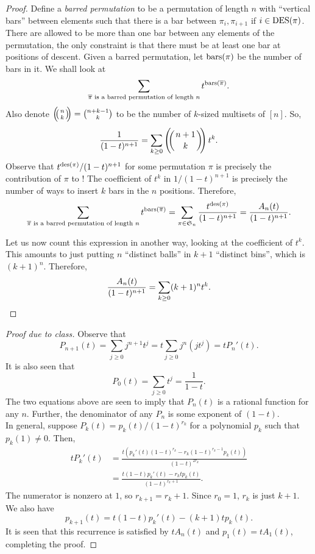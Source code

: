 	\begin{proof}
		Define a \emph{barred permutation} to be a permutation of length $n$ with ``vertical bars'' between elements such that there is a bar between $\pi_i,\pi_{i+1}$ if $i \in \operatorname{DES}(\pi)$. There are allowed to be more than one bar between any elements of the permutation, the only constraint is that there must be at least one bar at positions of descent. Given a barred permutation, let $\operatorname{bars}(\pi)$ be the number of bars in it. We shall look at
		\begin{equation}
			\label{eqn: counting to carlitz identity}
			\sum_{\overline{\pi} \text{ is a barred permutation of length $n$}} t^{\operatorname{bars}(\overline{\pi})}.
		\end{equation}
		Also denote $\mbinom{n}{k} = \binom{n+k-1}{k}$ to be the number of $k$-sized multisets of $[n]$. So,
		\[ \frac{1}{(1-t)^{n+1}} = \sum_{k \ge 0} \mbinom{n+1}{k} t^k. \]
		Observe that $t^{\operatorname{des}(\pi)}/(1-t)^{n+1}$ for some permutation $\pi$ is precisely the contribution of $\pi$ to ! The coefficient of $t^k$ in $1/(1-t)^{n+1}$ is precisely the number of ways to insert $k$ bars in the $n$ positions. Therefore,
		\[ \sum_{\overline{\pi} \text{ is a barred permutation of length $n$}} t^{\operatorname{bars}(\overline{\pi})} = \sum_{\pi \in \mathfrak{S}_n} \frac{t^{\operatorname{des}(\pi)}}{(1-t)^{n+1}} = \frac{A_n(t)}{(1-t)^{n+1}}. \]

		Let us now count this expression in another way, looking at the coefficient of $t^k$. This amounts to just putting $n$ ``distinct balls'' in $k+1$ ``distinct bins'', which is $(k+1)^n$. Therefore,
		\[ \frac{A_n(t)}{(1-t)^{n+1}} = \sum_{k \ge 0} (k+1)^n t^k. \qedhere \] 
	\end{proof}

	\begin{proof}[Proof due to class]
		Observe that
		\[ P_{n+1}(t) = \sum_{j \ge 0} j^{n+1} t^j = t \sum_{j \ge 0} j^n (jt^j) = t P_n'(t). \]
		It is also seen that
		\[ P_0(t) = \sum_{j \ge 0} t^j = \frac{1}{1-t}. \]
		The two equations above are seen to imply that $P_n(t)$ is a rational function for any $n$. Further, the denominator of any $P_n$ is some exponent of $(1-t)$. \\
		In general, suppose $P_k(t) = p_k(t)/(1-t)^{r_k}$ for a polynomial $p_k$ such that $p_k(1) \ne 0$. Then,
		\begin{align*}
			tP_k'(t) &= \frac{t \left( p_k'(t) (1-t)^{r_k} - r_k (1-t)^{r_k - 1} p_k(t) \right)}{(1-t)^{2r_k}} \\
				&= \frac{ t(1-t)p_k'(t) - r_k t p_k(t) }{(1-t)^{r_k+1}}.
		\end{align*}
		The numerator is nonzero at $1$, so $r_{k+1} = r_k + 1$. Since $r_0 = 1$, $r_k$ is just $k+1$. We also have
		\[ p_{k+1}(t) = t (1-t) p_k'(t) - (k+1) t p_k(t). \]
		It is seen that this recurrence is satisfied by $tA_n(t)$ and $p_1(t) = tA_1(t)$, completing the proof.
	\end{proof}

